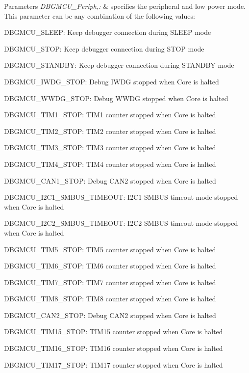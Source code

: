 \begin{DoxyParams}{Parameters}
{\em D\-B\-G\-M\-C\-U\-\_\-\-Periph,\-:} & specifies the peripheral and low power mode. This parameter can be any combination of the following values\-: \begin{DoxyItemize}
\item D\-B\-G\-M\-C\-U\-\_\-\-S\-L\-E\-E\-P\-: Keep debugger connection during S\-L\-E\-E\-P mode \item D\-B\-G\-M\-C\-U\-\_\-\-S\-T\-O\-P\-: Keep debugger connection during S\-T\-O\-P mode \item D\-B\-G\-M\-C\-U\-\_\-\-S\-T\-A\-N\-D\-B\-Y\-: Keep debugger connection during S\-T\-A\-N\-D\-B\-Y mode \item D\-B\-G\-M\-C\-U\-\_\-\-I\-W\-D\-G\-\_\-\-S\-T\-O\-P\-: Debug I\-W\-D\-G stopped when Core is halted \item D\-B\-G\-M\-C\-U\-\_\-\-W\-W\-D\-G\-\_\-\-S\-T\-O\-P\-: Debug W\-W\-D\-G stopped when Core is halted \item D\-B\-G\-M\-C\-U\-\_\-\-T\-I\-M1\-\_\-\-S\-T\-O\-P\-: T\-I\-M1 counter stopped when Core is halted \item D\-B\-G\-M\-C\-U\-\_\-\-T\-I\-M2\-\_\-\-S\-T\-O\-P\-: T\-I\-M2 counter stopped when Core is halted \item D\-B\-G\-M\-C\-U\-\_\-\-T\-I\-M3\-\_\-\-S\-T\-O\-P\-: T\-I\-M3 counter stopped when Core is halted \item D\-B\-G\-M\-C\-U\-\_\-\-T\-I\-M4\-\_\-\-S\-T\-O\-P\-: T\-I\-M4 counter stopped when Core is halted \item D\-B\-G\-M\-C\-U\-\_\-\-C\-A\-N1\-\_\-\-S\-T\-O\-P\-: Debug C\-A\-N2 stopped when Core is halted \item D\-B\-G\-M\-C\-U\-\_\-\-I2\-C1\-\_\-\-S\-M\-B\-U\-S\-\_\-\-T\-I\-M\-E\-O\-U\-T\-: I2\-C1 S\-M\-B\-U\-S timeout mode stopped when Core is halted \item D\-B\-G\-M\-C\-U\-\_\-\-I2\-C2\-\_\-\-S\-M\-B\-U\-S\-\_\-\-T\-I\-M\-E\-O\-U\-T\-: I2\-C2 S\-M\-B\-U\-S timeout mode stopped when Core is halted \item D\-B\-G\-M\-C\-U\-\_\-\-T\-I\-M5\-\_\-\-S\-T\-O\-P\-: T\-I\-M5 counter stopped when Core is halted \item D\-B\-G\-M\-C\-U\-\_\-\-T\-I\-M6\-\_\-\-S\-T\-O\-P\-: T\-I\-M6 counter stopped when Core is halted \item D\-B\-G\-M\-C\-U\-\_\-\-T\-I\-M7\-\_\-\-S\-T\-O\-P\-: T\-I\-M7 counter stopped when Core is halted \item D\-B\-G\-M\-C\-U\-\_\-\-T\-I\-M8\-\_\-\-S\-T\-O\-P\-: T\-I\-M8 counter stopped when Core is halted \item D\-B\-G\-M\-C\-U\-\_\-\-C\-A\-N2\-\_\-\-S\-T\-O\-P\-: Debug C\-A\-N2 stopped when Core is halted \item D\-B\-G\-M\-C\-U\-\_\-\-T\-I\-M15\-\_\-\-S\-T\-O\-P\-: T\-I\-M15 counter stopped when Core is halted \item D\-B\-G\-M\-C\-U\-\_\-\-T\-I\-M16\-\_\-\-S\-T\-O\-P\-: T\-I\-M16 counter stopped when Core is halted \item D\-B\-G\-M\-C\-U\-\_\-\-T\-I\-M17\-\_\-\-S\-T\-O\-P\-: T\-I\-M17 counter stopped when Core is halted \item 
\end{DoxyItemize}
\end{DoxyParams}
